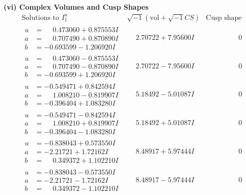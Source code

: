 \documentclass[1p]{elsarticle_modified}
\theoremstyle{definition}
\newcommand{\I}{\sqrt{-1}}
\begin{document}
\newpage\flushleft \textbf{(vi) Complex Volumes and Cusp Shapes}
$$\begin{array}{c|c|c}  
\text{Solutions to }I^u_{1}& \I (\text{vol} + \sqrt{-1}CS) & \text{Cusp shape}\\
 \hline 
\begin{aligned}
u &= \phantom{-}0.473060 + 0.875553 I \\
a &= \phantom{-}0.707490 + 0.870890 I \\
b &= -0.693599 - 1.206920 I\end{aligned}
 & \phantom{-}2.70722 + 7.95600 I & \phantom{-0.000000 } 0 \\ \hline\begin{aligned}
u &= \phantom{-}0.473060 - 0.875553 I \\
a &= \phantom{-}0.707490 - 0.870890 I \\
b &= -0.693599 + 1.206920 I\end{aligned}
 & \phantom{-}2.70722 - 7.95600 I & \phantom{-0.000000 } 0 \\ \hline\begin{aligned}
u &= -0.549471 + 0.842594 I \\
a &= \phantom{-}1.008210 - 0.819907 I \\
b &= -0.396404 + 1.083280 I\end{aligned}
 & \phantom{-}5.18492 - 5.01087 I & \phantom{-0.000000 } 0 \\ \hline\begin{aligned}
u &= -0.549471 - 0.842594 I \\
a &= \phantom{-}1.008210 + 0.819907 I \\
b &= -0.396404 - 1.083280 I\end{aligned}
 & \phantom{-}5.18492 + 5.01087 I & \phantom{-0.000000 } 0 \\ \hline\begin{aligned}
u &= -0.838043 + 0.573550 I \\
a &= -2.21721 + 1.72162 I \\
b &= \phantom{-}0.349372 + 1.102210 I\end{aligned}
 & \phantom{-}8.48917 + 5.97444 I & \phantom{-0.000000 } 0 \\ \hline\begin{aligned}
u &= -0.838043 - 0.573550 I \\
a &= -2.21721 - 1.72162 I \\
b &= \phantom{-}0.349372 - 1.102210 I\end{aligned}
 & \phantom{-}8.48917 - 5.97444 I & \phantom{-0.000000 } 0 \\ \hline\begin{aligned}

\end{aligned}
\end{array}$$
\end{document}
